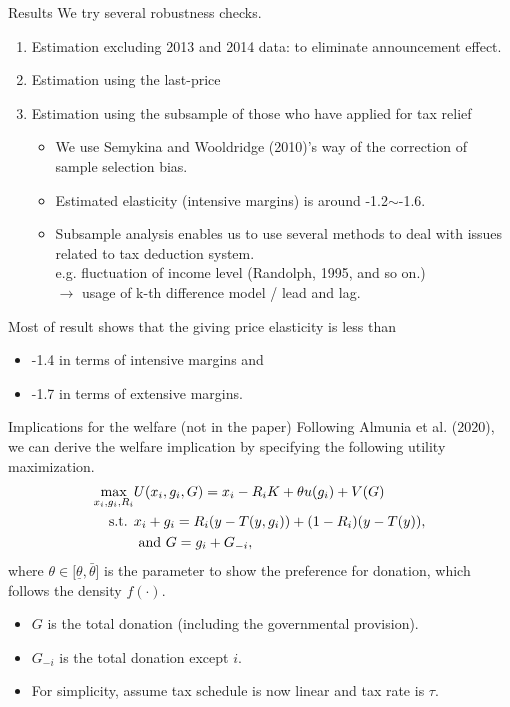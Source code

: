 \documentclass[dvipdfmx,10pt]{beamer}
\begin{document}
\begin{frame}{Results}
 We try several robustness checks.
		\begin{enumerate}
			\item Estimation excluding 2013 and 2014 data: to eliminate announcement effect.
			\item Estimation using the last-price
			\item Estimation using the subsample of those who have applied for tax relief
			\begin{itemize}
				\item We use Semykina and Wooldridge (2010)'s way of the correction of sample selection bias.
				\item Estimated elasticity (intensive margins) is around -1.2\(\sim\)-1.6.
				\item Subsample analysis enables us to use several methods to deal with issues related to tax deduction system.\\
				e.g. fluctuation of income level (Randolph, 1995, and so on.)\\
				$\to$ usage of k-th difference model / lead and lag.  
			\end{itemize}
		\end{enumerate}
		Most of result shows that the giving price elasticity is less than
		\begin{itemize}
			\item -1.4 in terms of intensive margins and 
			\item -1.7 in terms of extensive margins.
		\end{itemize}
\end{frame}

\begin{frame}{Implications for the welfare (not in the paper)}
	Following Almunia et al. (2020), we can derive the welfare implication by specifying the following utility maximization.
	\begin{align}
		\max_{x_i,g_i,R_i}&U(x_i,g_i,G)= x_i - R_iK +\theta u(g_i) + V(G)\notag\\
		\text{s.t. }&x_i + g_i = R_i(y-T(y, g_i)) + (1-R_i)(y-T(y)),\notag\\
		&\text{ and }G=g_i+G_{-i}\notag,
	\end{align}
	where $\theta\in[\underline{\theta},\bar{\theta}$] is the parameter to show the preference for donation, which follows the density $f(\cdot)$. 
	\begin{itemize}
		\item $G$ is the total donation (including the governmental provision).
		\item $G_{-i}$ is the total donation except $i$.
		\item For simplicity, assume tax schedule is now linear and tax rate is $\tau$.
	\end{itemize}
\end{frame}
\end{document}
